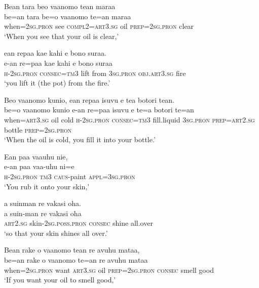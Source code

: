 \ea\label{ex:text01-134}
Bean tara beo vaanomo tean maraa\\
\gll be=an	tara	be=o	vaanomo	te=an	maraa\\
     when=2\textsc{sg}.\textsc{pron}	see	\textsc{compl}2=\textsc{art}3.\textsc{sg}	oil	\textsc{prep}=2\textsc{sg}.\textsc{pron}	clear\\
\glt `When you see that your oil is clear,'
\z

\ea\label{ex:text01-135}
ean repaa kae kahi e bono suraa.\\
\gll e-an	re=paa	kae	kahi	e	bono	suraa\\
     \textsc{h}-2\textsc{sg}.\textsc{pron}	\textsc{consec}=\textsc{tm}3	lift	from	3\textsc{sg}.\textsc{pron}	\textsc{obj}.\textsc{art}3.\textsc{sg}	fire\\
\glt `you lift it (the pot) from the fire.'
\z

\newpage
\ea\label{ex:text01-136}
Beo vaanomo kunio, ean repaa isuvu e tea botori tean.\\
\gll be=o	vaanomo	kunio	e-an	re=paa	isuvu	e	te=a	botori	te=an\\
     when=\textsc{art}3.\textsc{sg}	oil	cold	\textsc{h}-2\textsc{sg}.\textsc{pron}	\textsc{consec}=\textsc{tm}3	fill.liquid	3\textsc{sg}.\textsc{pron}	\textsc{prep}=\textsc{art}2.\textsc{sg}	bottle	\textsc{prep}=2\textsc{sg}.\textsc{pron}\\
\glt `When the oil is cold, you fill it into your bottle.'
\z

\ea\label{ex:text01-137}
Ean paa vaauhu nie,\\
\gll e-an	paa	vaa-uhu	ni=e\\
     \textsc{h}-2\textsc{sg}.\textsc{pron}	\textsc{tm}3	\textsc{caus}-paint	\textsc{appl}=3\textsc{sg}.\textsc{pron}\\
\glt `You rub it onto your skin,'
\z

\ea\label{ex:text01-138}
a suinman re vakasi oha.\\
\gll a	suin-man	re	vakasi	oha\\
     \textsc{art}2.\textsc{sg}	skin-2\textsc{sg}.\textsc{poss}.\textsc{pron}	\textsc{consec}	shine	all.over\\
\glt `so that your skin shines all over.'
\z

\ea\label{ex:text01-139}
Bean rake o vaanomo tean re avuhu mataa,\\
\gll be=an	rake	o	vaanomo	te=an	re	avuhu	mataa\\
     when=2\textsc{sg}.\textsc{pron}	want	\textsc{art}3.\textsc{sg}	oil	\textsc{prep}=2\textsc{sg}.\textsc{pron}	\textsc{consec}	smell	good\\
\glt `If you want your oil to smell good,'
\z

